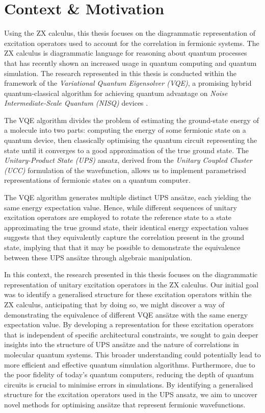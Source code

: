 \section{Context \& Motivation}%
\label{context-motivation}

Using the ZX calculus, this thesis focuses on the diagrammatic representation of excitation operators used to account for the correlation in fermionic systems. The ZX calculus is diagrammatic language for reasoning about quantum processes \cite{Coecke2011} that has recently shown an increased usage in quantum computing and quantum simulation. The research represented in this thesis is conducted within the framework of the \textit{Variational Quantum Eigensolver (VQE)}, a promising hybrid quantum-classical algorithm for achieving quantum advantage on \textit{Noise Intermediate-Scale Quantum (NISQ)} devices \cite{Cerezo2020}.

The VQE algorithm divides the problem of estimating the ground-state energy of a molecule into two parts: computing the energy of some fermionic state on a quantum device, then classically optimising the quantum circuit representing the state until it converges to a good approximation of the true ground state. The \textit{Unitary-Product State (UPS)} ansatz, derived from the \textit{Unitary Coupled Cluster (UCC)} formulation of the wavefunction, allows us to implement parametrised representations of fermionic states on a quantum computer.

The VQE algorithm generates multiple distinct UPS ansätze, each yielding the same energy expectation value. Hence, while different sequences of unitary excitation operators are employed to rotate the reference state to a state approximating the true ground state, their identical energy expectation values suggests that they equivalently capture the correlation present in the ground state, implying that that it may be possible to demonstrate the equivalence between these UPS ansätze through algebraic manipulation.

In this context, the research presented in this thesis focuses on the diagrammatic representation of unitary excitation operators in the ZX calculus. Our initial goal was to identify a generalised structure for these excitation operators within the ZX calculus, anticipating that by doing so, we might discover a way of demonstrating the equivalence of different VQE ansätze with the same energy expectation value. By developing a representation for these excitation operators that is independent of specific architectural constraints, we sought to gain deeper insights into the structure of UPS ansätze and the nature of correlations in molecular quantum systems. This broader understanding could potentially lead to more efficient and effective quantum simulation algorithms. Furthermore, due to the poor fidelity of today's quantum computers, reducing the depth of quantum circuits is crucial to minimise errors in simulations. By identifying a generalised structure for the excitation operators used in the UPS ansatz, we aim to uncover novel methods for optimising ansätze that represent fermionic wavefunctions.

